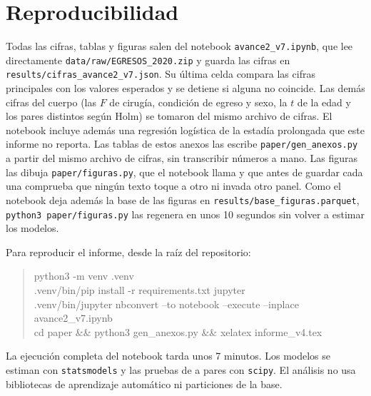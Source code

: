 \documentclass[10.5pt,a4paper,headings=small,abstract=false,bibliography=totoc,listof=totoc]{scrartcl}
\begin{document}
\section{Reproducibilidad}\label{anx:repro}

Todas las cifras, tablas y figuras salen del notebook \texttt{avance2\_v7.ipynb}, que lee directamente \texttt{data/raw/EGRESOS\_2020.zip} y guarda las cifras en \texttt{results/cifras\_avance2\_v7.json}. Su última celda compara las cifras principales con los valores esperados y se detiene si alguna no coincide. Las demás cifras del cuerpo (las $F$ de cirugía, condición de egreso y sexo, la $t$ de la edad y los pares distintos según Holm) se tomaron del mismo archivo de cifras. El notebook incluye además una regresión logística de la estadía prolongada que este informe no reporta. Las tablas de estos anexos las escribe \texttt{paper/gen\_anexos.py} a partir del mismo archivo de cifras, sin transcribir números a mano. Las figuras las dibuja \texttt{paper/figuras.py}, que el notebook llama y que antes de guardar cada una comprueba que ningún texto toque a otro ni invada otro panel. Como el notebook deja además la base de las figuras en \texttt{results/base\_figuras.parquet}, \texttt{python3 paper/figuras.py} las regenera en unos 10 segundos sin volver a estimar los modelos.

Para reproducir el informe, desde la raíz del repositorio:

\begin{quote}\small\ttfamily
python3 -m venv .venv\\
.venv/bin/pip install -r requirements.txt jupyter\\
.venv/bin/jupyter nbconvert --to notebook --execute --inplace avance2\_v7.ipynb\\
cd paper \&\& python3 gen\_anexos.py \&\& xelatex informe\_v4.tex
\end{quote}

La ejecución completa del notebook tarda unos 7 minutos. Los modelos se estiman con \texttt{statsmodels} y las pruebas de a pares con \texttt{scipy}. El análisis no usa bibliotecas de aprendizaje automático ni particiones de la base.
\end{document}
